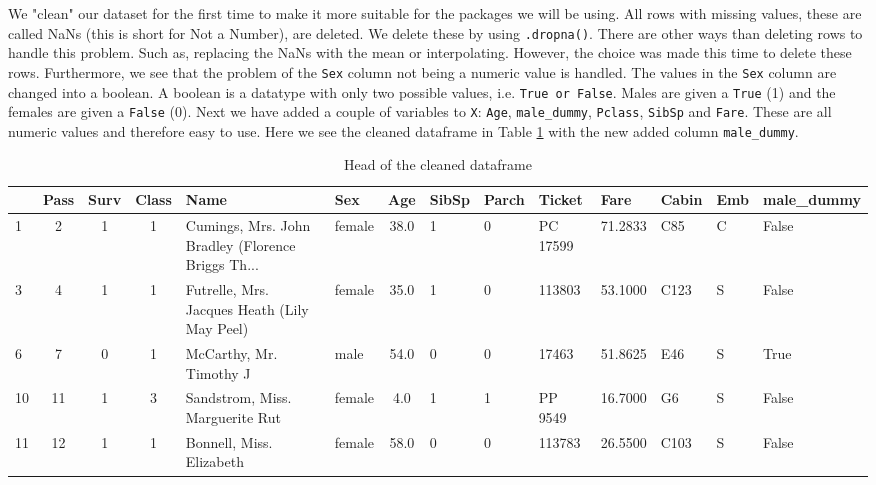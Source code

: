 \documentclass[11pt]{article}
\begin{document}
We "clean" our dataset for the first time to make it more suitable for
the packages we will be using. All rows with missing values, these are called
NaNs (this is short for Not a Number), are deleted. We delete these by using
\texttt{.dropna()}. There are other ways than deleting rows to handle this problem.
Such as, replacing the NaNs with the mean or interpolating. However, the
choice was made this time to delete these rows. Furthermore, we see that the
problem of the \texttt{Sex} column not being a numeric value is handled. The values
in the \texttt{Sex} column are changed into a boolean. A boolean is a datatype with
only two possible values, i.e. \texttt{True or False}. Males are given a \texttt{True} (1) and
the females are given a \texttt{False} (0). Next we have added a couple of variables
to \texttt{X}: \texttt{Age}, \texttt{male\_dummy}, \texttt{Pclass}, \texttt{SibSp} and \texttt{Fare}. These are all numeric
values and therefore easy to use.
Here we see the cleaned dataframe in Table \ref{tab:tabledfcleaned} with the new added column \texttt{male\_dummy}. 
\begin{table}
\small
\begin{center}
\caption{\label{tab:tabledfcleaned}Head of the cleaned dataframe}
\begin{adjustwidth}{-2cm}{}
\begin{tabular}{|l|c|c|c|p{3cm}|l|c|p{1cm}|p{1cm}|p{1cm}|p{1cm}|l|l|p{1cm}|}
\toprule
\hline
{} &  Pass &  Surv &  Class &                                               Name &     Sex &   Age &  SibSp &  Parch &    Ticket &     Fare & Cabin & Emb &  male\_dummy \\
\midrule
\hline
1  &            2 &         1 &       1 &  Cumings, Mrs. John Bradley (Florence Briggs Th... &  female &  38.0 &      1 &      0 &  PC 17599 &  71.2833 &   C85 &        C &       False \\
3  &            4 &         1 &       1 &       Futrelle, Mrs. Jacques Heath (Lily May Peel) &  female &  35.0 &      1 &      0 &    113803 &  53.1000 &  C123 &        S &       False \\
6  &            7 &         0 &       1 &                            McCarthy, Mr. Timothy J &    male &  54.0 &      0 &      0 &     17463 &  51.8625 &   E46 &        S &        True \\
10 &           11 &         1 &       3 &                    Sandstrom, Miss. Marguerite Rut &  female &   4.0 &      1 &      1 &   PP 9549 &  16.7000 &    G6 &        S &       False \\
11 &           12 &         1 &       1 &                           Bonnell, Miss. Elizabeth &  female &  58.0 &      0 &      0 &    113783 &  26.5500 &  C103 &        S &       False \\
\bottomrule
\hline
\end{tabular}
\end{adjustwidth}
\end{center}
\end{table}
\end{document}

